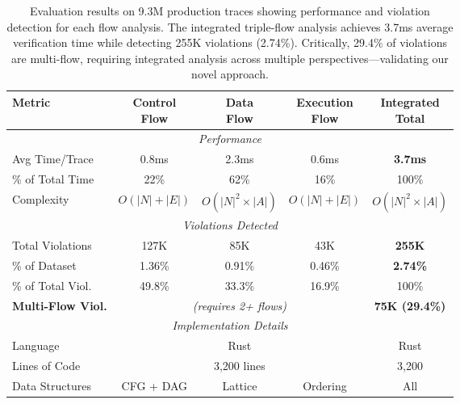 
\begin{table}[t]
\centering
\caption{Evaluation results on 9.3M production traces showing performance and violation detection for each flow analysis. The integrated triple-flow analysis achieves 3.7ms average verification time while detecting 255K violations (2.74\%). Critically, 29.4\% of violations are multi-flow, requiring integrated analysis across multiple perspectives—validating our novel approach.}
\label{tab:evaluation}
\small
\begin{tabular}{|l|c|c|c|c|}
\hline
\textbf{Metric} & \makecell{\textbf{Control}\\\textbf{Flow}} & \makecell{\textbf{Data}\\\textbf{Flow}} & \makecell{\textbf{Execution}\\\textbf{Flow}} & \makecell{\textbf{Integrated}\\\textbf{Total}} \\
\hline
\hline
\multicolumn{5}{|c|}{\textit{Performance}} \\
\hline
Avg Time/Trace & 0.8ms & 2.3ms & 0.6ms & \textbf{3.7ms} \\
\% of Total Time & 22\% & 62\% & 16\% & 100\% \\
Complexity & $O(|N|+|E|)$ & $O(|N|^2 \times |A|)$ & $O(|N|+|E|)$ & $O(|N|^2 \times |A|)$ \\
\hline
\multicolumn{5}{|c|}{\textit{Violations Detected}} \\
\hline
Total Violations & 127K & 85K & 43K & \textbf{255K} \\
\% of Dataset & 1.36\% & 0.91\% & 0.46\% & \textbf{2.74\%} \\
\% of Total Viol. & 49.8\% & 33.3\% & 16.9\% & 100\% \\
\hline
\textbf{Multi-Flow Viol.} & \multicolumn{3}{c|}{\textit{(requires 2+ flows)}} & \textbf{75K (29.4\%)} \\
\hline
\hline
\multicolumn{5}{|c|}{\textit{Implementation Details}} \\
\hline
Language & \multicolumn{3}{c|}{Rust} & Rust \\
Lines of Code & \multicolumn{3}{c|}{3,200 lines} & 3,200 \\
Data Structures & CFG + DAG & Lattice & Ordering & All \\
\hline
\end{tabular}

\vspace{0.2cm}


\end{table}
